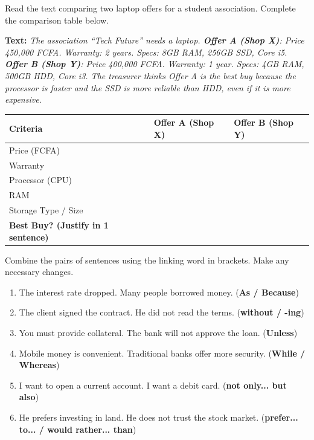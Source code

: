 \documentclass[11pt]{article}
\newcounter{popsec}
\newcounter{popsub}
\newcommand{\courssub}[1]{%
  \stepcounter{popsub}%
  \par\vspace{9pt}\noindent{\popxbold\fontsize{11.5}{13}\selectfont\color{popink}{\color{poporange}\thepopsec.\thepopsub}\hspace{6pt}#1}\par\nopagebreak\vspace{4pt}
}
\begin{document}
\courssub{Je m'entraîne}

\begin{exercice}
Read the text comparing two laptop offers for a student association. Complete the comparison table below.

\textbf{Text:} \emph{The association ``Tech Future'' needs a laptop. \textbf{Offer A (Shop X)}: Price 450,000 FCFA. Warranty: 2 years. Specs: 8GB RAM, 256GB SSD, Core i5. \textbf{Offer B (Shop Y)}: Price 400,000 FCFA. Warranty: 1 year. Specs: 4GB RAM, 500GB HDD, Core i3. The treasurer thinks Offer A is the best buy because the processor is faster and the SSD is more reliable than HDD, even if it is more expensive.}

\begin{center}
\begin{tabularx}{\linewidth}{|l|X|X|}
\hline
\textbf{Criteria} & \textbf{Offer A (Shop X)} & \textbf{Offer B (Shop Y)} \\ \hline
Price (FCFA) & & \\ \hline
Warranty & & \\ \hline
Processor (CPU) & & \\ \hline
RAM & & \\ \hline
Storage Type / Size & & \\ \hline
\textbf{Best Buy? (Justify in 1 sentence)} & \multicolumn{2}{c|}{} \\ \hline
\end{tabularx}
\end{center}
\end{exercice}

\begin{exercice}
Combine the pairs of sentences using the linking word in brackets. Make any necessary changes.

\begin{enumerate}
    \item The interest rate dropped. Many people borrowed money. \quad (\textbf{As / Because})
    \item The client signed the contract. He did not read the terms. \quad (\textbf{without / -ing})
    \item You must provide collateral. The bank will not approve the loan. \quad (\textbf{Unless})
    \item Mobile money is convenient. Traditional banks offer more security. \quad (\textbf{While / Whereas})
    \item I want to open a current account. I want a debit card. \quad (\textbf{not only... but also})
    \item He prefers investing in land. He does not trust the stock market. \quad (\textbf{prefer... to... / would rather... than})
\end{enumerate}
\end{exercice}
\end{document}
